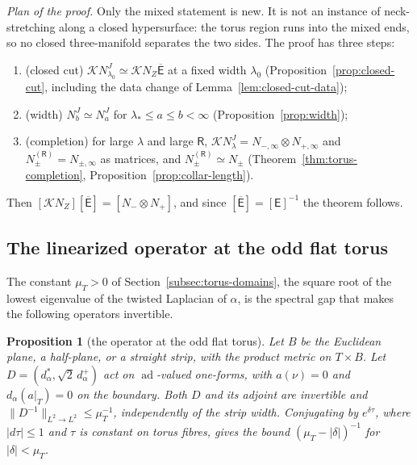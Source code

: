 \documentclass[11pt]{amsart}
\newtheorem{proposition}[theorem]{Proposition}
\theoremstyle{definition}
\theoremstyle{remark}
\theoremstyle{plain}
\numberwithin{equation}{section}
\newcommand{\ad}{\operatorname{ad}}
\begin{document}
\emph{Plan of the proof.} Only the mixed statement is new. It is not an
instance of neck-stretching along a closed hypersurface: the torus region runs
into the mixed ends, so no closed three-manifold separates the two sides. The
proof has three steps:
\begin{enumerate}[label=(\alph*)]
\item (closed cut) $\mathcal KN^J_{\lambda_0}\simeq\mathcal KN_Z\overline{\mathsf E}$ at a fixed
  width $\lambda_0$ (Proposition~\ref{prop:closed-cut}, including the data change
  of Lemma~\ref{lem:closed-cut-data});
\item (width) $N^J_b\simeq N^J_a$ for $\lambda_*\le a\le b<\infty$
  (Proposition~\ref{prop:width});
\item (completion) for large $\lambda$ and large $\mathsf R$,
  $\mathcal KN^J_\lambda=N_{-,\infty}\otimes N_{+,\infty}$ and $N_\pm^{(\mathsf R)}=N_{\pm,\infty}$
  as matrices, and $N^{(\mathsf R)}_\pm\simeq N_\pm$
  (Theorem~\ref{thm:torus-completion}, Proposition~\ref{prop:collar-length}).
\end{enumerate}
Then $[\mathcal KN_Z][\overline{\mathsf E}]=[N_-\otimes N_+]$, and since $[\overline{\mathsf E}]=[\mathsf E]^{-1}$
the theorem follows.

\subsection{The linearized operator at the odd flat torus}

The constant $\mu_T>0$ of Section~\ref{subsec:torus-domains}, the square root of the lowest eigenvalue of the twisted Laplacian of $\alpha$, is the spectral gap that makes the following operators invertible.

\begin{proposition}[the operator at the odd flat torus]\label{prop:flat-fibre}
Let $B$ be the Euclidean plane, a half-plane, or a straight strip,
with the product metric on $T\times B$. Let
$D=(d_\alpha^*,\sqrt2\,d_\alpha^+)$ act on $\ad$-valued one-forms,
with $a(\nu)=0$ and $d_\alpha(a|_T)=0$ on the boundary. Both $D$
and its adjoint are invertible and
$\|D^{-1}\|_{L^2\to L^2}\le\mu_T^{-1}$, independently of the strip
width. Conjugating by $e^{\delta\tau}$, where $|d\tau|\le1$ and
$\tau$ is constant on torus fibres, gives the bound
$(\mu_T-|\delta|)^{-1}$ for $|\delta|<\mu_T$.
\end{proposition}
\end{document}
